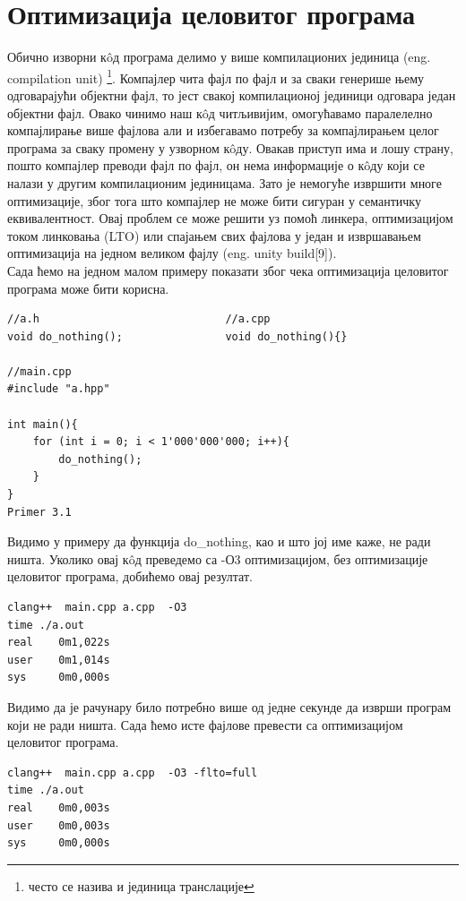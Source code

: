 \documentclass[12pt,oneside]{memoir}
\begin{document}
\chapter{Оптимизација целовитог програма}

Обично изворни к\^{o}д програма делимо у више компилационих јединица (eng. compilation unit) \footnote{често се назива и јединица транслације}.
Компајлер чита фајл по фајл и за сваки генерише њему одговарајући објектни фајл,
то јест свакој компилационој јединици одговара један објектни фајл.
Овако чинимо наш к\^{o}д читљивијим, омогућавамо паралелелно компајлирање више 
фајлова али и избегавамо потребу за компајлирањем целог програма за сваку промену
у узворном к\^{o}ду.
Овакав приступ има и лошу страну, пошто компајлер преводи фајл по фајл, он нема 
информације о к\^{o}ду који се налази у другим компилационим јединицама.
Зато је немогуће извршити многе оптимизације, због тога што компајлер не може 
бити сигуран у семантичку еквивалентност.
Овај проблем се може решити уз помоћ линкера,
оптимизацијом током линковања (LTO) или спајањем свих фајлова у један и извршавањем
оптимизација на једном великом фајлу (eng. unity build[9]).
\\
Сада ћемо на једном малом примеру показати због чека оптимизација целовитог програма 
може бити корисна.

\begin{lstlisting}
//a.h                             //a.cpp
void do_nothing();                void do_nothing(){} 

//main.cpp          
#include "a.hpp"

int main(){
    for (int i = 0; i < 1'000'000'000; i++){
        do_nothing();
    }
}
Primer 3.1
\end{lstlisting}

Видимо у примеру да функција  do{\_}nothing, као и што јој име каже, не ради ништа.
Уколико овај к\^{o}д преведемо са -О3 оптимизацијом, без оптимизације целовитог програма,
добићемо овај резултат.

\begin{lstlisting}
clang++  main.cpp a.cpp  -O3
time ./a.out 
real    0m1,022s
user    0m1,014s
sys     0m0,000s
\end{lstlisting}
Видимо да је рачунару било потребно више од једне секунде да изврши програм који не ради ништа.
Сада ћемо исте фајлове превести са оптимизацијом целовитог програма.
\begin{lstlisting}
clang++  main.cpp a.cpp  -O3 -flto=full
time ./a.out 
real    0m0,003s
user    0m0,003s
sys     0m0,000s
\end{lstlisting}
\end{document}
